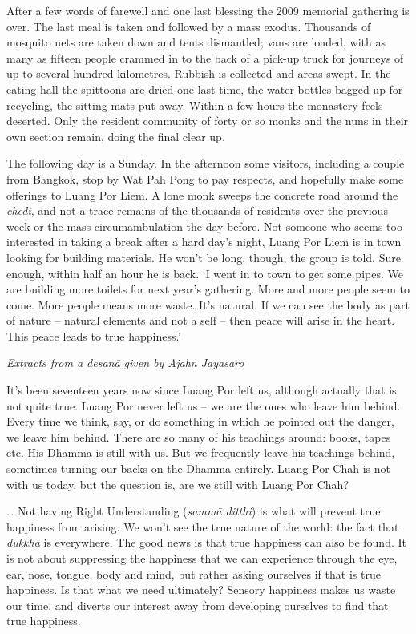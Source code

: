 After a few words of farewell and one last blessing the 2009 memorial
gathering is over. The last meal is taken and followed by a mass exodus. 
Thousands of mosquito nets are taken down and tents dismantled; vans are
loaded, with as many as fifteen people crammed in to the back of a
pick-up truck for journeys of up to several hundred kilometres. Rubbish
is collected and areas swept. In the eating hall the spittoons are dried
one last time, the water bottles bagged up for recycling, the sitting
mats put away. Within a few hours the monastery feels deserted. Only the
resident community of forty or so monks and the nuns in their own
section remain, doing the final clear up. 

The following day is a Sunday. In the afternoon some visitors, including
a couple from Bangkok, stop by Wat Pah Pong to pay respects, and
hopefully make some offerings to Luang Por Liem. A lone monk sweeps the
concrete road around the \emph{chedi}, and not a trace remains of the
thousands of residents over the previous week or the mass
circumambulation the day before. Not someone who seems too interested in
taking a break after a hard day's night, Luang Por Liem is in town
looking for building materials. He won't be long, though, the group is
told. Sure enough, within half an hour he is back. `I went in to town to
get some pipes. We are building more toilets for next year's gathering. 
More and more people seem to come. More people means more waste. It's
natural. If we can see the body as part of nature -- natural elements
and not a self -- then peace will arise in the heart. This peace leads
to true happiness.'

\emph{Extracts from a desanā given by Ajahn Jayasaro}

It's been seventeen years now since Luang Por left us, although actually
that is not quite true. Luang Por never left us -- we are the ones who
leave him behind. Every time we think, say, or do something in which he
pointed out the danger, we leave him behind. There are so many of his
teachings around: books, tapes etc. His Dhamma is still with us. But we
frequently leave his teachings behind, sometimes turning our backs on
the Dhamma entirely. Luang Por Chah is not with us today, but the
question is, are we still with Luang Por Chah? 

\ldots{} Not having Right Understanding (\emph{sammā ditthi}) is what
will prevent true happiness from arising. We won't see the true nature
of the world: the fact that \emph{dukkha} is everywhere. The good news
is that true happiness can also be found. It is not about suppressing
the happiness that we can experience through the eye, ear, nose, tongue, 
body and mind, but rather asking ourselves if that is true happiness. Is
that what we need ultimately? Sensory happiness makes us waste our time, 
and diverts our interest away from developing ourselves to find that
true happiness. 

